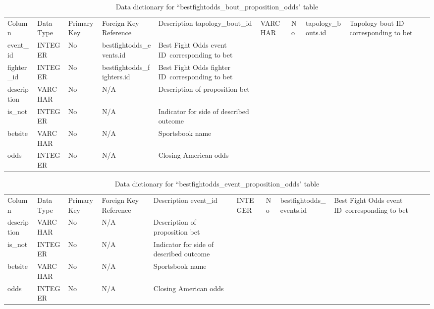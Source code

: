 \documentclass[12pt,twoside]{report}
\begin{document}
\tiny
\begin{longtable}{lllll}
\caption{Data dictionary for ``bestfightodds\_bout\_proposition\_odds" table}\\ 
\toprule
Column             & Data Type & Primary Key & Foreign Key Reference      & Description                                                                             \endfirsthead 
\toprule
tapology\_bout\_id & VARCHAR   & No          & tapology\_bouts.id         & Tapology bout ID corresponding to bet                                       \\
event\_id          & INTEGER   & No          & bestfightodds\_events.id   & Best Fight Odds event ID~corresponding to bet                               \\
fighter\_id        & INTEGER   & No          & bestfightodds\_fighters.id & Best Fight Odds fighter ID~corresponding to bet                             \\
description        & VARCHAR   & No          & N/A                        & Description of proposition bet                                                          \\
is\_not            & INTEGER   & No          & N/A                        & Indicator for side of described outcome  \\
betsite            & VARCHAR   & No          & N/A                        & Sportsbook name                                                                         \\
odds               & INTEGER   & No          & N/A                        & Closing American odds                                                                   \\
\bottomrule
\end{longtable}
\normalsize


\tiny
\begin{longtable}{lllll}
\caption{Data dictionary for ``bestfightodds\_event\_proposition\_odds" table}\\ 
\toprule
Column      & Data Type & Primary Key & Foreign Key Reference    & Description                                    \endfirsthead 
\toprule
event\_id   & INTEGER   & No          & bestfightodds\_events.id & Best Fight Odds event ID~corresponding to bet  \\
description & VARCHAR   & No          & N/A                      & Description of proposition bet                 \\
is\_not     & INTEGER   & No          & N/A                      & Indicator for side of described outcome        \\
betsite     & VARCHAR   & No          & N/A                      & Sportsbook name                                \\
odds        & INTEGER   & No          & N/A                      & Closing American odds                          \\
\bottomrule
\end{longtable}
\normalsize
\end{document}
